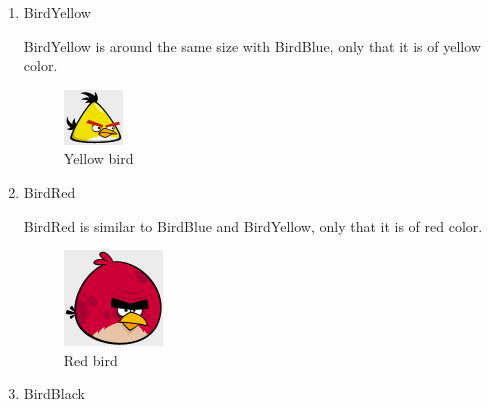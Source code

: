 \documentclass{dalthesis}
\begin{document}
\begin{enumerate}
\begin{enumerate}
\begin{enumerate}
      \item BirdYellow

      BirdYellow is around the same size with BirdBlue, only that it is of yellow color.

      \begin{figure}[H]
				\caption{Yellow bird}
        \includegraphics[width=.5\textwidth,keepaspectratio]{birds/yellow.png}
      \end{figure}

      \item BirdRed

      BirdRed is similar to BirdBlue and BirdYellow, only that it is of red color.

      \begin{figure}[H]
				\caption{Red bird}
        \includegraphics[width=.5\textwidth,keepaspectratio]{birds/red.png}
      \end{figure}

      \item BirdBlack


\end{enumerate}
\end{enumerate}
\end{enumerate}
\end{document}
